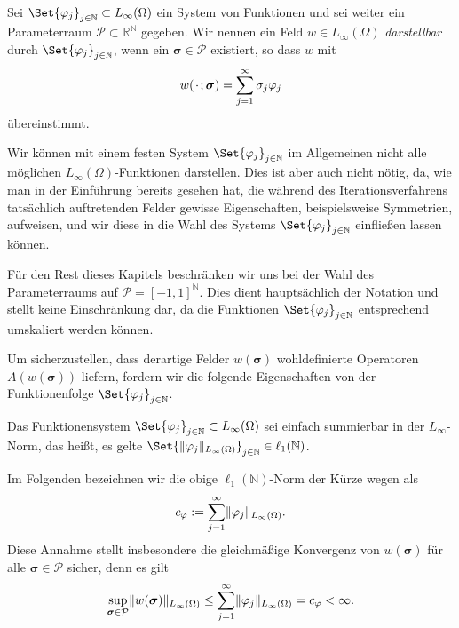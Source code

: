 \begin{Definition}
\label{definition:feld_entwickelbar}
    Sei $\Set{\varphi_{j}}_{j \in \mathbb{N}} \subset L_{\infty}(\Omega)$ ein System von Funktionen und sei weiter ein Parameterraum $\mathcal P \subset \mathbb{R}^{\mathbb{N}}$ gegeben.
    Wir nennen ein Feld $w \in L_{\infty}(\Omega)$ \emph{darstellbar} durch $\Set{\varphi_{j}}_{j \in \mathbb{N}}$, wenn ein $\bm{\sigma} \in \mathcal P$ existiert, so dass $w$ mit
    \begin{equation}
        w({\mkern2mu\cdot\mkern2mu}; \bm\sigma) = \sum_{j = 1}^{\infty} \sigma_{j} \varphi_{j}
    \end{equation}
    übereinstimmt.
\end{Definition}

Wir können mit einem festen System $\Set{\varphi_{j}}_{j \in \mathbb{N}}$ im Allgemeinen nicht alle möglichen $L_{\infty}(\Omega)$-Funktionen darstellen.
Dies ist aber auch nicht nötig, da, wie man in der Einführung bereits gesehen hat, die während des Iterationsverfahrens tatsächlich auftretenden Felder gewisse Eigenschaften, beispielsweise Symmetrien, aufweisen, und wir diese in die Wahl des Systems $\Set{\varphi_{j}}_{j \in \mathbb{N}}$ einfließen lassen können.

\begin{Bemerkung}
    Für den Rest dieses Kapitels beschränken wir uns bei der Wahl des Parameterraums auf $\mathcal P = [-1, 1]^{\mathbb{N}}$.
    Dies dient hauptsächlich der Notation und stellt keine Einschränkung dar, da die Funktionen $\Set{ \varphi_{j} }_{j \in \mathbb{N}}$ entsprechend umskaliert werden können.
\end{Bemerkung}

Um sicherzustellen, dass derartige Felder $w(\bm\sigma)$ wohldefinierte Operatoren $A(w(\bm\sigma))$ liefern, fordern wir die folgende Eigenschaften von der Funktionenfolge $\Set{\varphi_{j}}_{j \in \mathbb{N}}$.

\begin{Annahme}
\label{annahme:system_l1_summierbar}
    Das Funktionensystem $\Set{ \varphi_{j} }_{j \in \mathbb{N}} \subset L_{\infty}(\Omega)$ sei einfach summierbar in der $L_{\infty}$-Norm, das heißt, es gelte $\Set{ \norm{\varphi_{j}}_{L_{\infty}(\Omega) } }_{j \in \mathbb{N}} \in \ell_{1}(\mathbb{N})$.
\end{Annahme}

Im Folgenden bezeichnen wir die obige $\ell_{1}(\mathbb{N})$-Norm der Kürze wegen als
\begin{equation}
\label{eq:system_l1_norm}
    c_{\varphi} := \sum_{j = 1}^{\infty} \lVert\varphi_{j}\rVert_{L_{\infty}(\Omega)}.
\end{equation}
Diese Annahme stellt insbesondere die gleichmäßige Konvergenz von $w(\bm\sigma)$ für alle $\bm\sigma \in \mathcal P$ sicher, denn es gilt
\begin{equation}
\label{eq:rz_feld_norm_schranke}
    \sup_{\bm\sigma \in \mathcal P} \lVert w(\bm\sigma)\rVert_{L_{\infty}(\Omega)} \leq \sum_{j = 1}^{\infty} \lVert\varphi_{j}\rVert_{L_{\infty}(\Omega)} = c_{\varphi} < \infty.
\end{equation}

